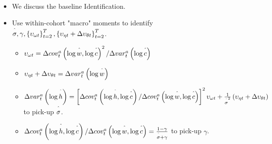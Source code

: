 \documentclass[notes=show]{beamer}
\begin{document}
\begin{frame}%


\begin{itemize}
\item We discuss the baseline Identification.

\item Use within-cohort "macro" moments to identify $\overset{\symbol{94}}{%
\sigma },\gamma ,\left\{ \upsilon _{\omega t}\right\} _{t=2}^{T},\left\{
\upsilon _{\eta t}+\Delta \upsilon _{\theta t}\right\} _{t=2}^{T}$.

\begin{itemize}
\item $\upsilon _{\omega t}=\Delta cov_{t}^{a}\left( \log \overset{\symbol{94%
}}{w},\log \overset{\symbol{94}}{c}\right) ^{2}/\Delta var_{t}^{a}\left(
\log \overset{\symbol{94}}{c}\right) $

\item $\upsilon _{\eta t}+\Delta \upsilon _{\theta t}=\Delta
var_{t}^{a}\left( \log \overset{\symbol{94}}{w}\right) $

\item $\Delta var_{t}^{a}\left( \log \overset{\symbol{94}}{h}\right) =\left[
\Delta cov_{t}^{a}\left( \log \overset{\symbol{94}}{h},\log \overset{\symbol{%
94}}{c}\right) /\Delta cov_{t}^{a}\left( \log \overset{\symbol{94}}{w},\log 
\overset{\symbol{94}}{c}\right) \right] ^{2}\upsilon _{\omega t}+\frac{1}{%
\overset{\symbol{94}}{\sigma }^{2}}\left( \upsilon _{\eta t}+\Delta \upsilon
_{\theta t}\right) $ to pick-up $\overset{\symbol{94}}{\sigma }$.

\item $\Delta cov_{t}^{a}\left( \log \overset{\symbol{94}}{h},\log \overset{%
\symbol{94}}{c}\right) /\Delta cov_{t}^{a}\left( \log \overset{\symbol{94}}{w%
},\log \overset{\symbol{94}}{c}\right) =\frac{1-\gamma }{\overset{\symbol{94}%
}{\sigma }+\gamma }$ to pick-up $\gamma $.
\end{itemize}
\end{itemize}

\transboxout%
\end{frame}%
\end{document}
